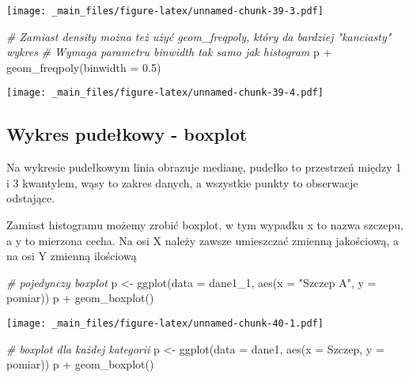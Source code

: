 \documentclass[
]{book}
\newenvironment{Shaded}{\begin{snugshade}}{\end{snugshade}}
\newcommand{\AttributeTok}[1]{\textcolor[rgb]{0.77,0.63,0.00}{#1}}
\newcommand{\CommentTok}[1]{\textcolor[rgb]{0.56,0.35,0.01}{\textit{#1}}}
\newcommand{\FloatTok}[1]{\textcolor[rgb]{0.00,0.00,0.81}{#1}}
\newcommand{\FunctionTok}[1]{\textcolor[rgb]{0.00,0.00,0.00}{#1}}
\newcommand{\NormalTok}[1]{#1}
\newcommand{\OtherTok}[1]{\textcolor[rgb]{0.56,0.35,0.01}{#1}}
\newcommand{\SpecialCharTok}[1]{\textcolor[rgb]{0.00,0.00,0.00}{#1}}
\newcommand{\StringTok}[1]{\textcolor[rgb]{0.31,0.60,0.02}{#1}}
\begin{document}
\texttt{[image: \_main\_files/figure-latex/unnamed-chunk-39-3.pdf]}

\begin{Shaded}
\begin{Highlighting}[]
\CommentTok{\# Zamiast density można też użyć geom\_freqpoly, który da bardziej "kanciasty" wykres}
\CommentTok{\# Wymaga parametru binwidth tak samo jak histogram}
\NormalTok{p }\SpecialCharTok{+} \FunctionTok{geom\_freqpoly}\NormalTok{(}\AttributeTok{binwidth =} \FloatTok{0.5}\NormalTok{)}
\end{Highlighting}
\end{Shaded}

\texttt{[image: \_main\_files/figure-latex/unnamed-chunk-39-4.pdf]}

\hypertarget{wykres-pudeux142kowy---boxplot}{%
\subsection{Wykres pudełkowy - boxplot}\label{wykres-pudeux142kowy---boxplot}}

Na wykresie pudełkowym linia obrazuje medianę, pudełko to przestrzeń między 1 i 3 kwantylem, wąsy to zakres danych, a wszystkie punkty to obserwacje odstające.

Zamiast histogramu możemy zrobić boxplot, w tym wypadku x to nazwa szczepu, a y to mierzona cecha. Na osi X należy zawsze umieszczać zmienną jakościową, a na osi Y zmienną ilościową

\begin{Shaded}
\begin{Highlighting}[]
\CommentTok{\# pojedynczy boxplot}
\NormalTok{p }\OtherTok{\textless{}{-}} \FunctionTok{ggplot}\NormalTok{(}\AttributeTok{data =}\NormalTok{ dane1\_1, }\FunctionTok{aes}\NormalTok{(}\AttributeTok{x =} \StringTok{"Szczep A"}\NormalTok{, }\AttributeTok{y =}\NormalTok{ pomiar))}
\NormalTok{p }\SpecialCharTok{+} \FunctionTok{geom\_boxplot}\NormalTok{()}
\end{Highlighting}
\end{Shaded}

\texttt{[image: \_main\_files/figure-latex/unnamed-chunk-40-1.pdf]}

\begin{Shaded}
\begin{Highlighting}[]
\CommentTok{\# boxplot dla każdej kategorii}
\NormalTok{p }\OtherTok{\textless{}{-}} \FunctionTok{ggplot}\NormalTok{(}\AttributeTok{data =}\NormalTok{ dane1, }\FunctionTok{aes}\NormalTok{(}\AttributeTok{x =}\NormalTok{ Szczep, }\AttributeTok{y =}\NormalTok{ pomiar))}
\NormalTok{p }\SpecialCharTok{+} \FunctionTok{geom\_boxplot}\NormalTok{()}
\end{Highlighting}
\end{Shaded}
\end{document}
